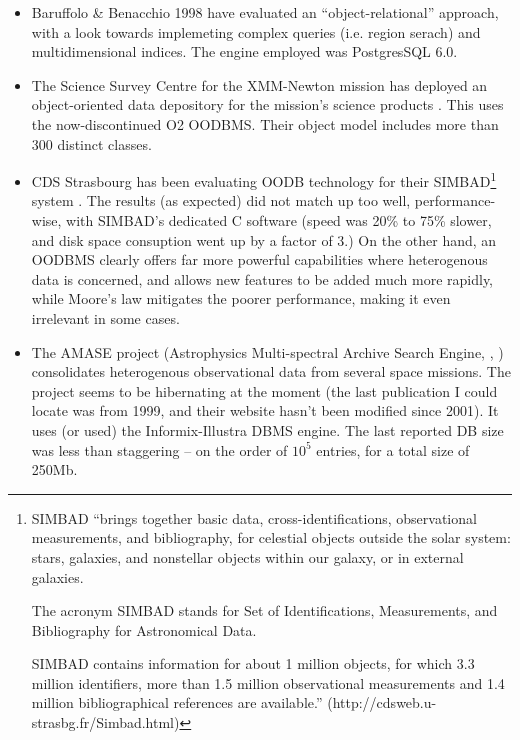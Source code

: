 \documentclass[10pt]{article}
\begin{document}
\begin{itemize} 

\item Baruffolo \& Benacchio 1998 \cite{OODB3} have evaluated an
``object-relational'' approach, with a look towards implemeting complex queries
(i.e. region serach) and multidimensional indices. The engine employed was
PostgresSQL 6.0. 

\item The Science Survey Centre for the XMM-Newton mission has deployed an
object-oriented data depository for the mission's science products
\cite{OODB1}. This uses the now-discontinued O2 OODBMS. Their object model
includes more than 300 distinct classes. 

\item CDS Strasbourg has been evaluating OODB technology for their
SIMBAD\footnote{SIMBAD ``brings together basic data, cross-identifications,
observational measurements, and bibliography, for celestial objects outside the
solar system: stars, galaxies, and nonstellar objects within our galaxy, or in
external galaxies.

The acronym SIMBAD stands for Set of Identifications, Measurements, and
Bibliography for Astronomical Data.

SIMBAD contains information for about 1 million objects, for which 3.3 million
identifiers, more than 1.5 million observational measurements and 1.4 million
bibliographical references are available.''
(http://cdsweb.u-strasbg.fr/Simbad.html)} system \cite{OODB2}. The results (as
expected) did not match up too well, performance-wise, with SIMBAD's dedicated
C software (speed was 20\% to 75\% slower, and disk space consuption went up by
a factor of 3.) On the other hand, an OODBMS clearly offers far more powerful
capabilities where heterogenous data is concerned, and allows new features to
be added much more rapidly, while Moore's law mitigates the poorer performance,
making it even irrelevant in  some cases.

\item The AMASE project (Astrophysics Multi-spectral Archive Search Engine,
\cite{AMASE}, \cite{AMASE2}) consolidates heterogenous observational data from
several space missions. The project seems to be hibernating at the moment (the
last publication I could locate was from 1999, and their website hasn't been
modified since 2001). It uses (or used) the Informix-Illustra DBMS engine. The
last reported DB size was less than staggering --  on the order of $10^5$
entries, for a total size of 250Mb. 

\end{itemize}
\end{document}
